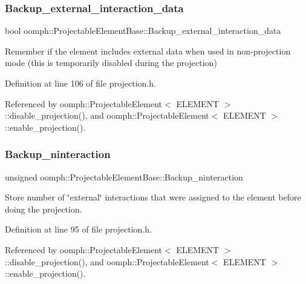 \subsubsection{\texorpdfstring{Backup\+\_\+external\+\_\+interaction\+\_\+data}{Backup\_external\_interaction\_data}}
{\footnotesize\ttfamily bool oomph\+::\+Projectable\+Element\+Base\+::\+Backup\+\_\+external\+\_\+interaction\+\_\+data\hspace{0.3cm}{\ttfamily [protected]}}



Remember if the element includes external data when used in non-\/projection mode (this is temporarily disabled during the projection) 



Definition at line 106 of file projection.\+h.



Referenced by oomph\+::\+Projectable\+Element$<$ E\+L\+E\+M\+E\+N\+T $>$\+::disable\+\_\+projection(), and oomph\+::\+Projectable\+Element$<$ E\+L\+E\+M\+E\+N\+T $>$\+::enable\+\_\+projection().

\mbox{\label{classoomph_1_1ProjectableElementBase_a638bf48f5b8dd513c18413cd3878c0d1}} 
\subsubsection{\texorpdfstring{Backup\+\_\+ninteraction}{Backup\_ninteraction}}
{\footnotesize\ttfamily unsigned oomph\+::\+Projectable\+Element\+Base\+::\+Backup\+\_\+ninteraction\hspace{0.3cm}{\ttfamily [protected]}}



Store number of \char`\"{}external\char`\"{} interactions that were assigned to the element before doing the projection. 



Definition at line 95 of file projection.\+h.



Referenced by oomph\+::\+Projectable\+Element$<$ E\+L\+E\+M\+E\+N\+T $>$\+::disable\+\_\+projection(), and oomph\+::\+Projectable\+Element$<$ E\+L\+E\+M\+E\+N\+T $>$\+::enable\+\_\+projection().

